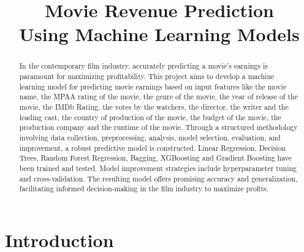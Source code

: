 \documentclass[conference]{IEEEtran}
\begin{document}
\title{Movie Revenue Prediction\\ Using Machine Learning Models}

\author{
     \vspace*{3.0pt}
    \and
     \vspace*{3.0pt}
}

\maketitle

\begin{abstract}
    In the contemporary film industry, accurately predicting a movie's earnings is paramount for maximizing profitability. This project aims to develop a machine learning model for predicting movie earnings based on input features like the movie name, the MPAA rating of the movie, the genre of the movie, the year of release of the movie, the IMDb Rating, the votes by the watchers, the director, the writer and the leading cast, the country of production of the movie, the budget of the movie, the production company and the runtime of the movie. Through a structured methodology involving data collection, preprocessing, analysis, model selection, evaluation, and improvement, a robust predictive model is constructed. Linear Regression, Decision Trees, Random Forest Regression, Bagging, XGBoosting and Gradient Boosting have been trained and tested. Model improvement strategies include hyperparameter tuning and cross-validation. The resulting model offers promising accuracy and generalization, facilitating informed decision-making in the film industry to maximize profits.
\end{abstract}

\IEEEpeerreviewmaketitle

\section{Introduction}
\end{document}
